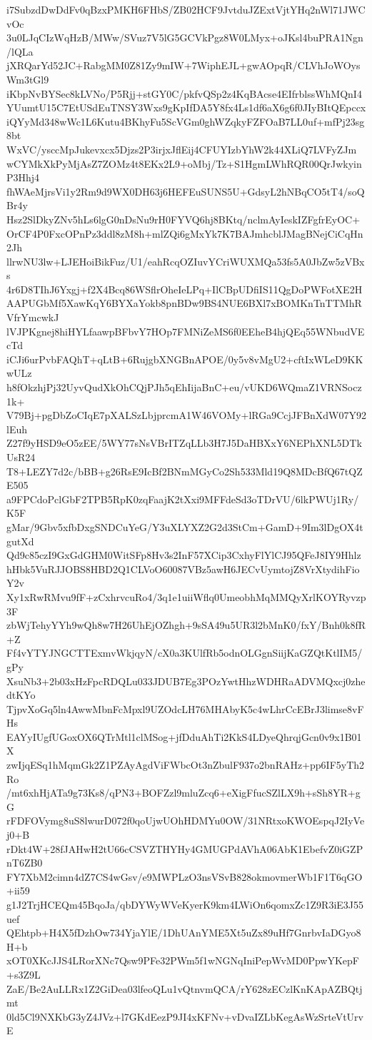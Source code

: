 i7SubzdDwDdFv0qBzxPMKH6FHbS/ZB02HCF9JvtduJZExtVjtYHq2nWl71JWCvOc
3u0LJqCIzWqHzB/MWw/SVuz7V5lG5GCVkPgz8W0LMyx+oJKsl4buPRA1Ngn/lQLa
jXRQarYd52JC+RabgMM0Z81Zy9mIW+7WiphEJL+gwAOpqR/CLVhJoWOysWm3tGl9
iKbpNvBYSec8kLVNo/P5Rjj+stGY0C/pkfvQSp2z4KqBAcse4EIfrblssWhMQnI4
YUumtU15C7EtUSdEuTNSY3Wxs9gKpIfDA5Y8fx4Ls1df6aX6g6f0JIyBItQEpccx
iQYyMd348wWc1L6Kutu4BKhyFu5ScVGm0ghWZqkyFZFOaB7LL0uf+mfPj23sg8bt
WxVC/ysccMpJukevxcx5Djzs2P3irjxJflEij4CFUYIzbYhW2k44XLiQ7LVFyZJm
wCYMkXkPyMjAsZ7ZOMz4t8EKx2L9+oMbj/Tz+S1HgmLWhRQR00QrJwkyinP3Hhj4
fhWAeMjrsVi1y2Rm9d9WX0DH63j6HEFEuSUNS5U+GdsyL2hNBqCO5tT4/soQBr4y
Hsz2SlDkyZNv5hLs6lgG0nDsNu9rH0FYVQ6hj8BKtq/nclmAyIeskIZFgfrEyOC+
OrCF4P0FxcOPnPz3ddl8zM8h+mlZQi6gMxYk7K7BAJmhcblJMagBNejCiCqHn2Jh
llrwNU3lw+LJEHoiBikFuz/U1/eahRcqOZIuvYCriWUXMQa53fs5A0JbZw5zVBxs
4r6D8TIhJ6Yxgj+f2X4Bcq86WSflrOheIeLPq+IlCBpUDfiIS11QgDoPWFotXE2H
AAPUGbMf5XawKqY6BYXaYokb8pnBDw9BS4NUE6BXl7xBOMKnTnTTMhRVfrYmcwkJ
lVJPKgnej8hiHYLfaawpBFbvY7HOp7FMNiZeMS6f0EEheB4hjQEq55WNbudVEcTd
iCJi6urPvbFAQhT+qLtB+6RujgbXNGBnAPOE/0y5v8vMgU2+cftIxWLeD9KKwULz
h8fOkzhjPj32UyvQudXkOhCQjPJh5qEhIijaBnC+eu/vUKD6WQmaZ1VRNSocz1k+
V79Bj+pgDbZoCIqE7pXALSzLbjprcmA1W46VOMy+lRGa9CcjJFBnXdW07Y92lEuh
Z27f9yHSD9eO5zEE/5WY77sNsVBrITZqLLb3H7J5DaHBXxY6NEPhXNL5DTkUsR24
T8+LEZY7d2c/bBB+g26RsE9IcBf2BNmMGyCo2Sh533Mld19Q8MDcBfQ67tQZE505
a9FPCdoPclGbF2TPB5RpK0zqFaajK2tXxi9MFFdeSd3oTDrVU/6lkPWUj1Ry/K5F
gMar/9Gbv5xfbDxgSNDCuYeG/Y3uXLYXZ2G2d3StCm+GamD+9Im3lDgOX4tgutXd
Qd9c85czI9GxGdGHM0WitSFp8Hv3s2InF57XCip3CxhyFlYlCJ95QFeJ8IY9Hhlz
hHbk5VuRJJOBS8HBD2Q1CLVoO60087VBz5awH6JECvUymtojZ8VrXtydihFioY2v
Xy1xRwRMvu9fF+zCxhrvcuRo4/3q1e1uiiWflq0UmeobhMqMMQyXrlKOYRyvzp3F
zbWjTehyYYh9wQh8w7H26UhEjOZhgh+9sSA49u5UR3l2bMnK0/fxY/Bnh0k8fR+Z
Ff4vYTYJNGCTTExmvWkjqyN/cX0a3KUlfRb5odnOLGgnSiijKaGZQtKtlIM5/gPy
XsuNb3+2b03xHzFpcRDQLu033JDUB7Eg3POzYwtHhzWDHRaADVMQxcj0zhedtKYo
TjpvXoGq5ln4AwwMbnFcMpxl9UZOdcLH76MHAbyK5c4wLhrCcEBrJ3limse8vFHs
EAYyIUgfUGoxOX6QTrMtl1clMSog+jfDduAhTi2KkS4LDyeQhrqjGcn0v9x1B01X
zwIjqESq1hMqmGk2Z1PZAyAgdViFWbcOt3nZbulF937o2bnRAHz+pp6IF5yTh2Ro
/mt6xhHjATa9g73Ks8/qPN3+BOFZzl9mluZcq6+eXigFfucSZlLX9h+sSh8YR+gG
rFDFOVymg8uS8lwurD072f0qoUjwUOhHDMYu0OW/31NRtxoKWOEspqJ2IyVej0+B
rDkt4W+28fJAHwH2tU66cCSVZTHYHy4GMUGPdAVhA06AbK1EbefvZ0iGZPnT6ZB0
FY7XbM2cimn4dZ7CS4wGsv/e9MWPLzO3nsVSvB828okmovmerWb1F1T6qGO+ii59
g1J2TrjHCEQm45BqoJa/qbDYWyWVeKyerK9km4LWiOn6qomxZc1Z9R3iE3J55uef
QEhtpb+H4X5fDzhOw734YjaYlE/1DhUAnYME5Xt5uZx89uHf7GnrbvIaDGyo8H+b
xOT0XKcJJS4LRorXNc7Qsw9PFe32PWm5f1wNGNqIniPepWvMD0PpwYKepF+s3Z9L
ZaE/Be2AuLLRx1Z2GiDea03lfeoQLu1vQtnvmQCA/rY628zECzlKnKApAZBQtjmt
0ld5Cl9NXKbG3yZ4JVz+l7GKdEezP9JI4xKFNv+vDvaIZLbKegAsWzSrteVtUrvE
